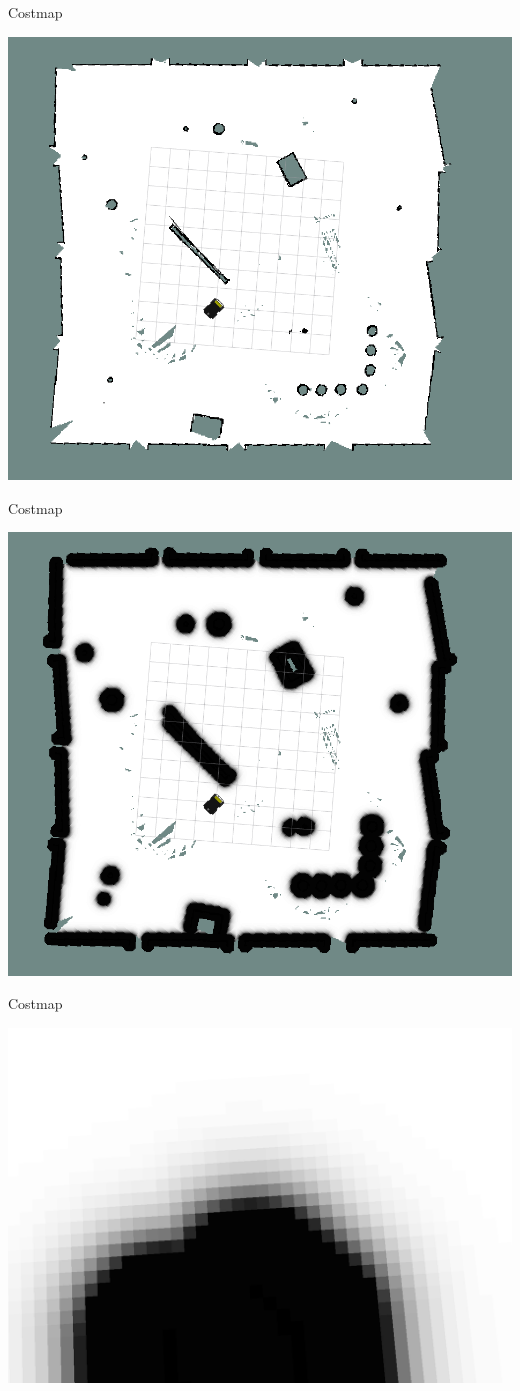 \documentclass{beamer}
\begin{document}
\begin{frame}{Costmap} 
	\subtitle{Navigation Stack}
	\centering
	\includegraphics[width=.7\linewidth]{figures/costmap_0.png}
\end{frame}

\begin{frame}{Costmap} 
	\subtitle{Navigation Stack}
	\centering
	\includegraphics[width=.7\linewidth]{figures/costmap_1.png}
\end{frame}

\begin{frame}{Costmap} 
	\subtitle{Navigation Stack}
	\centering
	\includegraphics[width=.7\linewidth]{figures/costmap_3.png}
\end{frame}
\end{document}
